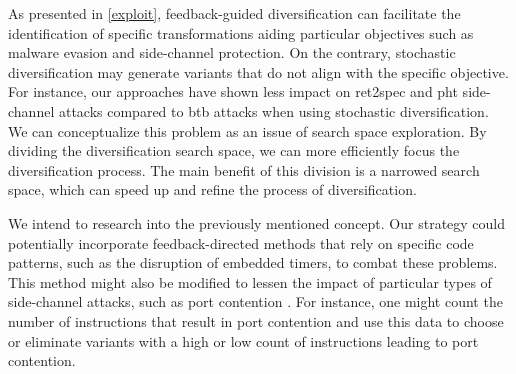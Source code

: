     
\begin{strategy}
As presented in \autoref{exploit}, feedback-guided diversification can facilitate the identification of specific transformations aiding particular objectives such as malware evasion and side-channel protection. 
On the contrary, stochastic diversification may generate variants that do not align with the specific objective. 
For instance, our approaches have shown less impact on ret2spec and pht side-channel attacks compared to btb attacks when using stochastic diversification.
We can conceptualize this problem as an issue of search space exploration. 
By dividing the diversification search space, we can more efficiently focus the diversification process. 
The main benefit of this division is a narrowed search space, which can speed up and refine the process of diversification. 


We intend to research into the previously mentioned concept. 
Our strategy could potentially incorporate feedback-directed methods that rely on specific code patterns, such as the disruption of embedded timers, to combat these problems. 
This method might also be modified to lessen the impact of particular types of side-channel attacks, such as port contention \cite{10.1145/3488932.3517411}. 
For instance, one might count the number of instructions that result in port contention and use this data to choose or eliminate variants with a high or low count of instructions leading to port contention.



\begin{comment}%



\end{comment}

\end{strategy}